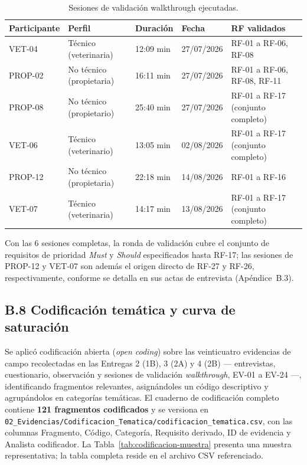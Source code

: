 \documentclass[journal,onecolumn]{IEEEtran}
\begin{document}
	\begin{table}[H]
		\centering
		\small
		\caption{Sesiones de validación walkthrough ejecutadas.}
		\label{tab:walkthrough}
		\begin{tabularx}{\textwidth}{@{}p{2.6cm} p{3.2cm} p{2.4cm} p{1.8cm} X@{}}
			\toprule
			\textbf{Participante} & \textbf{Perfil} & \textbf{Duración} & \textbf{Fecha} & \textbf{RF validados} \\
			\midrule
			VET-04 & Técnico (veterinaria) & 12:09 min & 27/07/2026 & RF-01 a RF-06, RF-08 \\
			PROP-02 & No técnico (propietaria) & 16:11 min & 27/07/2026 & RF-01 a RF-06, RF-08, RF-11 \\
			PROP-08 & No técnico (propietario) & 25:40 min & 27/07/2026 & RF-01 a RF-17 (conjunto completo) \\
			VET-06 & Técnico (veterinario) & 13:05 min & 02/08/2026 & RF-01 a RF-17 (conjunto completo) \\
			PROP-12 & No técnico (propietaria) & 22:18 min & 14/08/2026 & RF-01 a RF-16 \\
			VET-07 & Técnico (veterinaria) & 14:17 min & 13/08/2026 & RF-01 a RF-17 (conjunto completo) \\
			\bottomrule
		\end{tabularx}
	\end{table}
	
	Con las 6 sesiones completas, la ronda de validación cubre el conjunto de
	requisitos de prioridad \emph{Must} y \emph{Should} especificados hasta
	RF-17; las sesiones de PROP-12 y VET-07 son además el origen directo de
	RF-27 y RF-26, respectivamente, conforme se detalla en sus actas de
	entrevista (Apéndice~B.3).
	
	
	\subsection*{B.8 Codificación temática y curva de saturación}
	\label{sec:codificacion}
	
	Se aplicó codificación abierta (\emph{open coding}) sobre las veinticuatro
	evidencias de campo recolectadas en las Entregas 2 (1B), 3 (2A) y 4 (2B)
	--- entrevistas, cuestionario, observación y sesiones de validación
	\emph{walkthrough}, EV-01 a EV-24 ---, identificando fragmentos relevantes,
	asignándoles un código descriptivo y agrupándolos en categorías temáticas.
	El cuaderno de codificación completo contiene \textbf{121 fragmentos
		codificados} y se versiona en
	\texttt{02\_Evidencias/Codificacion\_Tematica/codificacion\_tematica.csv},
	con las columnas Fragmento, Código, Categoría, Requisito derivado, ID de
	evidencia y Analista codificador. La Tabla~\ref{tab:codificacion-muestra}
	presenta una muestra representativa; la tabla completa reside en el archivo
	CSV referenciado.
	
\end{document}
